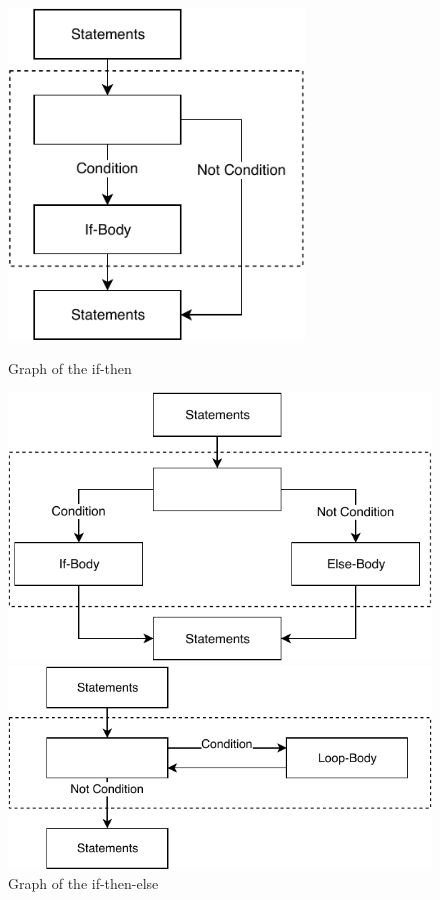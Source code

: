\begin{figure}[ht]
  \centering
  \begin{minipage}[h]{0.45\textwidth}
  	\centering
    \includegraphics[width=0.7\textwidth]{images/if}
    \caption{Graph of the if-then}
    \label{fig:cfg_if}
  \end{minipage}
  \hfill
  \begin{minipage}[h]{0.45\textwidth}
  	\centering
    \includegraphics[width=\textwidth]{images/if-else}
    \caption{Graph of the if-then-else}
    \label{fig:cfg_if-else}
  \end{minipage}
  \newline \newline \vfill
  \begin{minipage}[h]{0.45\textwidth}
  	\centering
    \includegraphics[width=\textwidth]{images/while}

\end{minipage}
\end{figure}
